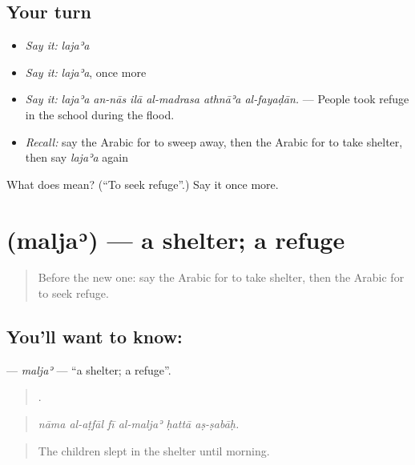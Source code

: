 \subsection*{Your turn}
\begin{itemize}
\raggedright
  \item \emph{Say it:} \emph{lajaʾa}
  \item \emph{Say it:} \emph{lajaʾa}, once more
  \item \emph{Say it:} \emph{lajaʾa an-nās ilā al-madrasa athnāʾa al-fayaḍān.} — People took refuge in the school during the flood.
  \item \emph{Recall:} say the Arabic for to sweep away, then the Arabic for to take shelter, then say \emph{lajaʾa} again
\end{itemize}

\begin{tcolorbox}[breakable,colback=teal!4,colframe=teal!35!black,title={Before you move on}]
What does  mean? (\textquotedblleft{}To seek refuge\textquotedblright{}.) Say it once more.
\end{tcolorbox}
\section[\texorpdfstring{\ar{ملجأ} (maljaʾ)}{ملجأ (maljaʾ)}]{ (maljaʾ) — a shelter; a refuge}

\label{lesson:AR-C487-malja}



\begin{quote}
Before the new one: say the Arabic for to take shelter, then the Arabic for to seek refuge.
\end{quote}

\subsection*{You'll want to know: }
\textbf{} — \emph{maljaʾ} — \textquotedblleft{}a shelter; a refuge\textquotedblright{}.

\begin{quote}
     .
\end{quote}

\begin{quote}
\emph{nāma al-aṭfāl fī al-maljaʾ ḥattā aṣ-ṣabāḥ.}
\end{quote}

\begin{quote}
The children slept in the shelter until morning.
\end{quote}


